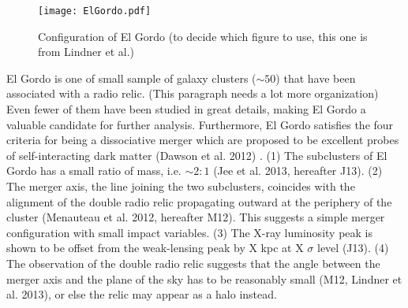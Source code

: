 %
%
\begin{figure}
	\texttt{[image: ElGordo.pdf]}
	\caption{Configuration of El Gordo (to decide which figure to use,
	this one is from Lindner et al.) \label{fig:config}}
\end{figure}
El Gordo is one of small sample of galaxy clusters ($\sim 50$) that have
been associated with a radio relic. (This paragraph needs a lot more
organization) Even fewer of them have been studied in
great details, making El Gordo a valuable candidate for further analysis. 
%
%
Furthermore, El Gordo satisfies the four criteria for being a dissociative merger which are proposed to be excellent
probes of self-interacting dark matter (Dawson et al. 2012) . (1) The subclusters
of El Gordo has a small ratio of mass, i.e. $\sim 2:1$ (Jee et al. 2013,
hereafter J13). (2) The merger axis, the line joining the two subclusters,
coincides with the alignment of the double radio relic propagating outward at the periphery of the cluster (Menauteau et al. 2012,
hereafter M12). This suggests a simple merger configuration with small
impact variables.  (3) The X-ray luminosity peak is shown to be offset
from the weak-lensing peak by X kpc at X $\sigma$ level (J13). (4) The
observation of the double radio relic suggests that the angle between the
merger axis and the plane of the sky has to be reasonably small (M12,
Lindner et al. 2013), or else
the relic may appear as a halo instead. \citep{S13} \par 


